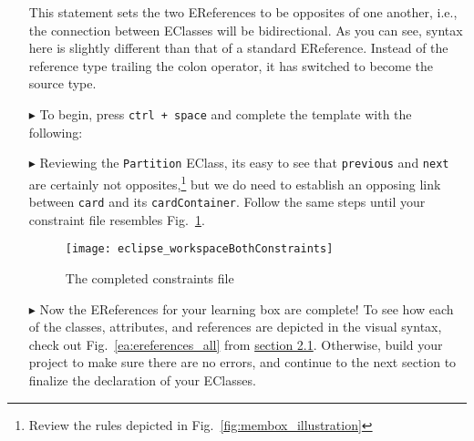 \begin{itemize}
This statement sets the two EReferences to be opposites of one another, i.e., the connection between EClasses will be bidirectional. As you can see, syntax here
is slightly different than that of a standard EReference. Instead of the reference type trailing the colon operator, it has switched to become the source type.

\vspace{0.5cm}

\item[$\blacktriangleright$] To begin, press \texttt{ctrl + space} and complete the template with the following:


\item[$\blacktriangleright$] Reviewing the \texttt{Partition} EClass, its easy to see that \texttt{previous} and \texttt{next} are certainly not
opposites,\footnote{Review the rules depicted in Fig.~\ref{fig:membox_illustration}} but we do need to establish an opposing link between
\texttt{card} and its \texttt{cardContainer}. Follow the same steps until your constraint file resembles Fig.~\ref{eclipse:bothConstraints}.

\begin{figure}[htbp]
	\centering
  \texttt{[image: eclipse\_workspaceBothConstraints]}
	\caption{The completed constraints file}
	\label{eclipse:bothConstraints}
\end{figure} 

\newpage

\item[$\blacktriangleright$] Now the EReferences for your learning box are complete! To see how each of the classes, attributes, and references
are depicted in the visual syntax, check out Fig.~\ref{ea:ereferences_all} from \hyperlink{sec:static vis}{section 2.1}. Otherwise, build your project to
make sure there are no errors, and continue to the next section to finalize the declaration of your EClasses.


\end{itemize}

